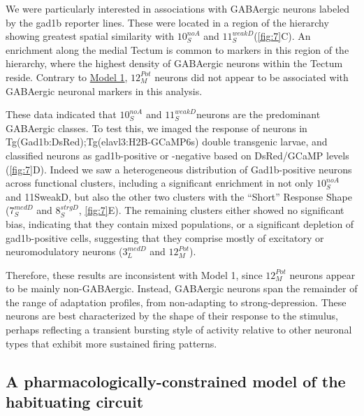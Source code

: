 \documentclass[9pt,lineno]{RandlettLab_elife}
\begin{document}
We were particularly interested in associations with GABAergic neurons labeled by the gad1b reporter lines. These were located in a region of the hierarchy showing greatest spatial similarity with $10_{S}^{noA}$ and $11_{S}^{weakD}$(\autoref{fig:7}C). An enrichment along the medial Tectum is common to markers in this region of the hierarchy, where the highest density of GABAergic neurons within the Tectum reside. Contrary to \underline{Model 1}, $12_{M}^{Pot}$ neurons did not appear to be associated with GABAergic neuronal markers in this analysis.  

These data indicated that $10_{S}^{noA}$ and $11_{S}^{weakD}$neurons are the predominant GABAergic classes. To test this, we imaged the response of neurons in Tg(Gad1b:DsRed);Tg(elavl3:H2B-GCaMP6s) double transgenic larvae,  and classified neurons as gad1b-positive or -negative based on DsRed/GCaMP levels (\autoref{fig:7}D). Indeed we saw a heterogeneous distribution of Gad1b-positive neurons across functional clusters, including a significant enrichment in not only $10_{S}^{noA}$ and 11SweakD, but also the other two clusters with the “Short” Response Shape ($7_{S}^{medD}$ and $8_{S}^{strgD}$, \autoref{fig:7}E). The remaining clusters either showed no significant bias, indicating that they contain mixed populations, or a significant depletion of gad1b-positive cells, suggesting that they comprise mostly of excitatory or neuromodulatory neurons ($3_{L}^{medD}$ and $12_{M}^{Pot}$). 

Therefore, these results are inconsistent with Model 1, since $12_{M}^{Pot}$ neurons appear to be mainly non-GABAergic. Instead, GABAergic neurons span the remainder of the range of adaptation profiles, from non-adapting to strong-depression. These neurons are best characterized by the shape of their response to the stimulus, perhaps reflecting a transient bursting style of activity relative to other neuronal types that exhibit more sustained firing patterns. 

\subsection{A pharmacologically-constrained model of the habituating circuit}
\end{document}
